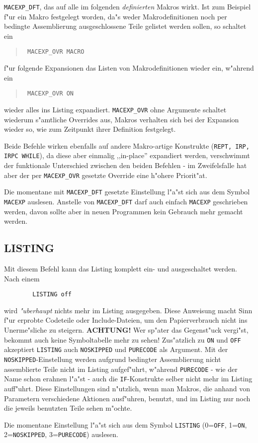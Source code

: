 \documentclass[12pt,a4paper,twoside]{report}
\makeatletter
\newcommand{\ii}[1]{{\it #1}}
\newcommand{\bb}[1]{{\bf #1}}
\newcommand{\tty}[1]{{\tt #1}}
\newcommand{\ttindex}[1]{\index{#1@{\tt #1}}}
\makeatother
\begin{document}
\tty{MACEXP\_DFT}, das auf alle im folgenden {\em definierten} Makros
wirkt.  Ist zum Beispiel f"ur ein Makro festgelegt worden, da"s weder
Makrodefinitionen noch per bedingte Assemblierung ausgeschlossene
Teile gelistet werden sollen, so schaltet ein
\begin{quote}{\tt
	MACEXP\_OVR  MACRO
}\end{quote}
f"ur folgende Expansionen das Listen von Makrodefinitionen wieder ein,
w"ahrend ein
\begin{quote}{\tt
	MACEXP\_OVR ON
}\end{quote}
wieder alles ins Listing expandiert.  \tty{MACEXP\_OVR} ohne
Argumente schaltet wiederum s"amtliche Overrides aus, Makros
verhalten sich bei der Expansion wieder so, wie zum Zeitpunkt ihrer
Definition festgelegt.
\par
Beide Befehle wirken ebenfalls auf andere Makro-artige Konstrukte
(\tty{REPT, IRP, IRPC WHILE}), da diese aber einmalig ,,in-place''
expandiert werden, verschwimmt der funktionale Unterschied zwischen
den beiden Befehlen - im Zweifelsfalle hat aber der per
\tty{MACEXP\_OVR} gesetzte Override eine h"ohere Priorit"at.

Die momentane mit \tty{MACEXP\_DFT} gesetzte Einstellung l"a"st sich
aus dem Symbol \tty{MACEXP} auslesen.  Anstelle von \tty{MACEXP\_DFT}
darf auch einfach \tty{MACEXP} geschrieben werden, davon sollte aber
in neuen Programmen kein Gebrauch mehr gemacht werden.


\subsection{LISTING}
\ttindex{LISTING}

Mit diesem Befehl kann das Listing komplett ein- und ausgeschaltet
werden. Nach einem
\begin{verbatim}
        LISTING off
\end{verbatim}
wird \ii{"uberhaupt} nichts mehr im Listing ausgegeben.  Diese Anweisung
macht Sinn f"ur erprobte Codeteile oder Include-Dateien, um den
Papierverbrauch nicht ins Unerme"sliche zu steigern.  \bb{ACHTUNG!}
Wer sp"ater das Gegenst"uck vergi"st, bekommt auch keine Symboltabelle
mehr zu sehen!  Zus"atzlich zu \tty{ON} und \tty{OFF} akzeptiert
\tty{LISTING} auch \tty{NOSKIPPED} und \tty{PURECODE} als Argument.  Mit
der \tty{NOSKIPPED}-Einstellung werden aufgrund bedingter Assemblierung
nicht assemblierte Teile nicht im Listing aufgef"uhrt, w"ahrend
\tty{PURECODE} - wie der Name schon erahnen l"a"st - auch die
\tty{IF}-Konstrukte selber nicht mehr im Listing auff"uhrt.  Diese
Einstellungen sind n"utzlich, wenn man Makros, die anhand von
Parametern verschiedene Aktionen ausf"uhren, benutzt, und im Listing
nur noch die jeweils benutzten Teile sehen m"ochte.
\par
Die momentane Einstellung l"a"st sich aus dem Symbol \tty{LISTING}
(0=\tty{OFF}, 1=\tty{ON}, 2=\tty{NOSKIPPED}, 3=\tty{PURECODE}) auslesen.
\end{document}
